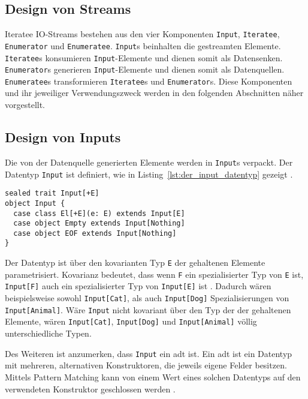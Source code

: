 \subsection{Design von Streams} %
\label{sub:design}

Iteratee IO-Streams bestehen aus den vier Komponenten \lstinline|Input|, \lstinline|Iteratee|, \lstinline|Enumerator| und \lstinline|Enumeratee|.
\lstinline|Input|s beinhalten die gestreamten Elemente.
\lstinline|Iteratee|s konsumieren \lstinline|Input|-Elemente und dienen somit als Datensenken.
\lstinline|Enumerator|s generieren \lstinline|Input|-Elemente und dienen somit als Datenquellen.
\lstinline|Enumeratee|s transformieren \lstinline|Iteratee|s und \lstinline|Enumerator|s.
Diese Komponenten und ihr jeweiliger Verwendungszweck werden in den folgenden Abschnitten näher vorgestellt.



\subsection{Design von Inputs} %
\label{sub:design_inputs}

Die von der Datenquelle generierten Elemente werden in \lstinline|Input|s verpackt.
Der Datentyp \lstinline|Input| ist definiert, wie in Listing~\ref{lst:der_input_datentyp} gezeigt \cite[vgl.][Z.~224]{play_iteratee_source_code}.

\begin{lstlisting}[caption=Der Input-Datentyp, label=lst:der_input_datentyp]
sealed trait Input[+E]
object Input {
  case class El[+E](e: E) extends Input[E]
  case object Empty extends Input[Nothing]
  case object EOF extends Input[Nothing]
}
\end{lstlisting}

Der Datentyp ist über den kovarianten Typ \lstinline|E| der gehaltenen Elemente parametrisiert.
Kovarianz bedeutet, dass wenn \lstinline|F| ein spezialisierter Typ von \lstinline|E| ist, \lstinline|Input[F]| auch ein spezialisierter Typ von \lstinline|Input[E]| ist \cite[vgl.][S.~11]{variance}.
Dadurch wären beispielsweise sowohl \lstinline|Input[Cat]|, als auch \lstinline|Input[Dog]| Spezialisierungen von \lstinline|Input[Animal]|.
Wäre \lstinline|Input| nicht kovariant über den Typ der der gehaltenen Elemente, wären \lstinline|Input[Cat]|, \lstinline|Input[Dog]| und \lstinline|Input[Animal]| völlig unterschiedliche Typen.

Des Weiteren ist anzumerken, dass \lstinline|Input| ein \gls{adt} ist.
Ein \gls{adt} ist ein Datentyp mit mehreren, alternativen Konstruktoren, die jeweils eigene Felder besitzen.
Mittels Pattern Matching kann von einem Wert eines solchen Datentyps auf den verwendeten Konstruktor geschlossen werden \cite[vgl.][S.~14--15]{algebraic_data_type}.

